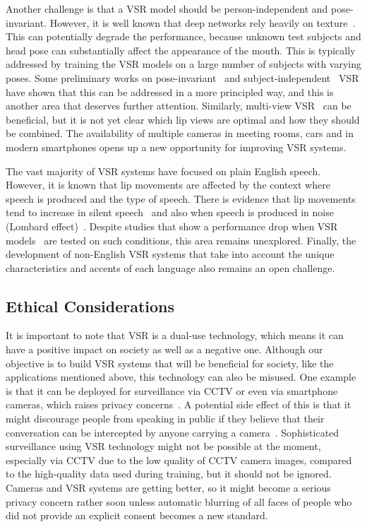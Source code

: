\documentclass[twocolumn]{article}
\begin{document}
Another challenge is that a VSR model should be person-independent and pose-invariant. However, it is well known that deep networks rely heavily on texture~\cite{geirhos2018imagenet}. This can potentially degrade the performance, because unknown test subjects and head pose can substantially affect the appearance of the mouth. This is typically addressed by training the VSR models on a large number of subjects with varying poses. Some preliminary works on pose-invariant~\cite{cheng2020towards} and subject-independent~\cite{Wand2017} VSR have shown that this can be addressed in a more principled way, and this is another area that deserves further attention. Similarly, multi-view VSR~\cite{petridis2017end} can be beneficial, but it is not yet clear which lip views are optimal and how they should be combined. The availability of multiple cameras in meeting rooms, cars and in modern smartphones opens up a new opportunity for improving VSR systems.

The vast majority of VSR systems have focused on plain English speech. However, it is known that lip movements are affected by the context where speech is produced and the type of speech. There is evidence that lip movements tend to increase in silent speech~\cite{bicevskis2016effects} and also when speech is produced in noise (Lombard effect)~\cite{vsimko2016hyperarticulation}. Despite studies that show a performance drop when VSR models~\cite{ma19b_interspeech,petridis2018visual,heracleous2013analysis}
are tested on such conditions, this area remains unexplored. Finally, the development of non-English VSR systems that take into account the unique characteristics and accents of each language also remains an open challenge.

\subsection{Ethical Considerations}
It is important to note that VSR is a dual-use technology, which means it can have a positive impact on society as well as a negative one. Although our objective is to build VSR systems that will be beneficial for society, like the applications mentioned above, this technology can also be misused. One example is that it can be deployed for surveillance via CCTV or even via smartphone cameras, which raises privacy concerns~\cite{nyt2018,vice2021}. A potential side effect of this is that it might discourage people from speaking in public if they believe that their conversation can be intercepted by anyone carrying a camera~\cite{vice2021}. Sophisticated surveillance using VSR technology might not be possible at the moment, especially via CCTV due to the low quality of CCTV camera images, compared to the high-quality data used during training, but it should not be ignored. Cameras and VSR systems are getting better, so it might become a serious privacy concern rather soon unless automatic blurring of all faces of people who did not provide an explicit consent becomes a new standard.
\end{document}
